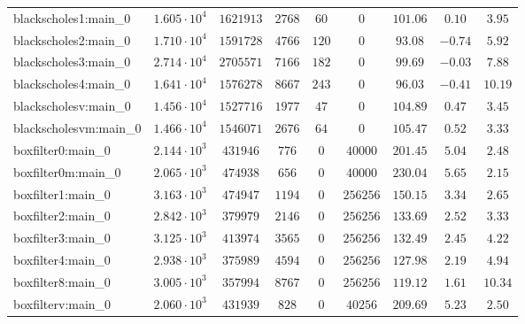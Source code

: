 \begin{tabular}{|l|c|c|c|c|c|c|c|c|}
blackscholes1:main\_0          & $ 1.605 \cdot 10^{4} $ & $ 1621913  $ & $ 2768   $ & $ 60   $ & $ 0        $ & $ 101.06      $ & $ 0.10    $ & $ 3.95    $ \\
blackscholes2:main\_0          & $ 1.710 \cdot 10^{4} $ & $ 1591728  $ & $ 4766   $ & $ 120  $ & $ 0        $ & $ 93.08       $ & $ -0.74   $ & $ 5.92    $ \\
blackscholes3:main\_0          & $ 2.714 \cdot 10^{4} $ & $ 2705571  $ & $ 7166   $ & $ 182  $ & $ 0        $ & $ 99.69       $ & $ -0.03   $ & $ 7.88    $ \\
blackscholes4:main\_0          & $ 1.641 \cdot 10^{4} $ & $ 1576278  $ & $ 8667   $ & $ 243  $ & $ 0        $ & $ 96.03       $ & $ -0.41   $ & $ 10.19   $ \\
blackscholesv:main\_0          & $ 1.456 \cdot 10^{4} $ & $ 1527716  $ & $ 1977   $ & $ 47   $ & $ 0        $ & $ 104.89      $ & $ 0.47    $ & $ 3.45    $ \\
blackscholesvm:main\_0         & $ 1.466 \cdot 10^{4} $ & $ 1546071  $ & $ 2676   $ & $ 64   $ & $ 0        $ & $ 105.47      $ & $ 0.52    $ & $ 3.33    $ \\
boxfilter0:main\_0             & $ 2.144 \cdot 10^{3} $ & $ 431946   $ & $ 776    $ & $ 0    $ & $ 40000    $ & $ 201.45      $ & $ 5.04    $ & $ 2.48    $ \\
boxfilter0m:main\_0            & $ 2.065 \cdot 10^{3} $ & $ 474938   $ & $ 656    $ & $ 0    $ & $ 40000    $ & $ 230.04      $ & $ 5.65    $ & $ 2.15    $ \\
boxfilter1:main\_0             & $ 3.163 \cdot 10^{3} $ & $ 474947   $ & $ 1194   $ & $ 0    $ & $ 256256   $ & $ 150.15      $ & $ 3.34    $ & $ 2.65    $ \\
boxfilter2:main\_0             & $ 2.842 \cdot 10^{3} $ & $ 379979   $ & $ 2146   $ & $ 0    $ & $ 256256   $ & $ 133.69      $ & $ 2.52    $ & $ 3.33    $ \\
boxfilter3:main\_0             & $ 3.125 \cdot 10^{3} $ & $ 413974   $ & $ 3565   $ & $ 0    $ & $ 256256   $ & $ 132.49      $ & $ 2.45    $ & $ 4.22    $ \\
boxfilter4:main\_0             & $ 2.938 \cdot 10^{3} $ & $ 375989   $ & $ 4594   $ & $ 0    $ & $ 256256   $ & $ 127.98      $ & $ 2.19    $ & $ 4.94    $ \\
boxfilter8:main\_0             & $ 3.005 \cdot 10^{3} $ & $ 357994   $ & $ 8767   $ & $ 0    $ & $ 256256   $ & $ 119.12      $ & $ 1.61    $ & $ 10.34   $ \\
boxfilterv:main\_0             & $ 2.060 \cdot 10^{3} $ & $ 431939   $ & $ 828    $ & $ 0    $ & $ 40256    $ & $ 209.69      $ & $ 5.23    $ & $ 2.50    $ \\

\end{tabular}
